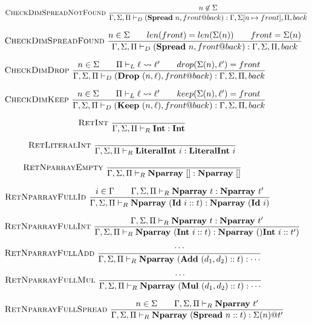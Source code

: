 \documentclass{article}
\begin{document}
\begin{figure}
    $$\textsc{CheckDimSpreadNotFound}~\frac{n \not\in \Sigma}{\Gamma, \Sigma, \Pi \vdash_D (\textbf{Spread}~n, front @ back) : \Gamma, \Sigma[n \mapsto front], \Pi, back}$$

    $$\textsc{CheckDimSpreadFound}~\frac{n \in \Sigma \qquad len(front) = len(\Sigma(n)) \qquad front = \Sigma(n)}{\Gamma, \Sigma, \Pi \vdash_D (\textbf{Spread}~n, front @ back) : \Gamma, \Sigma, \Pi, back}$$

    $$\textsc{CheckDimDrop}~\frac{n \in \Sigma \qquad \Pi \vdash_L \ell \rightsquigarrow \ell' \qquad drop(\Sigma(n), \ell') = front}{\Gamma, \Sigma, \Pi \vdash_D (\textbf{Drop}~(n, \ell), front @ back) : \Gamma, \Sigma, \Pi, back}$$

    $$\textsc{CheckDimKeep}~\frac{n \in \Sigma \qquad \Pi \vdash_L \ell \rightsquigarrow \ell' \qquad keep(\Sigma(n), \ell') = front}{\Gamma, \Sigma, \Pi \vdash_D (\textbf{Keep}~(n, \ell), front @ back) : \Gamma, \Sigma, \Pi, back}$$

    $$\textsc{RetInt}~\frac{}{\Gamma, \Sigma, \Pi \vdash_R \textbf{Int} : \textbf{Int}}$$

    $$\textsc{RetLiteralInt}~\frac{}{\Gamma, \Sigma, \Pi \vdash_R \textbf{LiteralInt}~i : \textbf{LiteralInt}~i}$$

    $$\textsc{RetNparrayEmpty}~\frac{}{\Gamma, \Sigma, \Pi \vdash_R \textbf{Nparray}~[] : \textbf{Nparray}~[]}$$

    $$\textsc{RetNparrayFullId}~\frac{i \in \Gamma \qquad \Gamma, \Sigma, \Pi \vdash_R \textbf{Nparray}~t : \textbf{Nparray}~t'}{\Gamma, \Sigma, \Pi \vdash_R \textbf{Nparray}~(\textbf{Id}~i :: t) : \textbf{Nparray}~(\textbf{Id}~i)}$$

    $$\textsc{RetNparrayFullInt}~\frac{\Gamma, \Sigma, \Pi \vdash_R \textbf{Nparray}~t : \textbf{Nparray}~t'}{\Gamma, \Sigma, \Pi \vdash_R \textbf{Nparray}~(\textbf{Int}~i :: t) : \textbf{Nparray}~()\textbf{Int}~i :: t')}$$

    $$\textsc{RetNparrayFullAdd}~\frac{\cdots}{\Gamma, \Sigma, \Pi \vdash_R \textbf{Nparray}~(\textbf{Add}~(d_1, d_2) :: t) : \cdots}$$

    $$\textsc{RetNparrayFullMul}~\frac{\cdots}{\Gamma, \Sigma, \Pi \vdash_R \textbf{Nparray}~(\textbf{Mul}~(d_1, d_2) :: t) : \cdots}$$

    $$\textsc{RetNparrayFullSpread}~\frac{n \in \Sigma \qquad \Gamma, \Sigma, \Pi \vdash_R \textbf{Nparray}~t'}{\Gamma, \Sigma, \Pi \vdash_R \textbf{Nparray}~(\textbf{Spread}~n :: t) : \Sigma(n) @ t'}$$


\end{figure}
\end{document}
